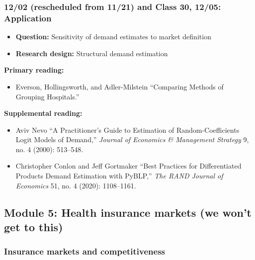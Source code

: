 \documentclass[11pt,]{article}
\providecommand{\tightlist}{%
  \setlength{\itemsep}{0pt}\setlength{\parskip}{0pt}}
\begin{document}
\hypertarget{rescheduled-from-1121-and-class-30-1205-application}{%
\subsubsection{12/02 (rescheduled from 11/21) and Class 30, 12/05:
Application}\label{rescheduled-from-1121-and-class-30-1205-application}}

\begin{itemize}
\tightlist
\item
  \textbf{Question:} Sensitivity of demand estimates to market
  definition
\item
  \textbf{Research design:} Structural demand estimation
\end{itemize}

\textbf{Primary reading:}

\begin{itemize}
\tightlist
\item
  Everson, Hollingsworth, and Adler-Milstein {``Comparing Methods of
  Grouping Hospitals.''}
\end{itemize}

\textbf{Supplemental reading:}

\begin{itemize}
\tightlist
\item
  Aviv Nevo {``A Practitioner's Guide to Estimation of
  Random-Coefficients Logit Models of Demand,''} \emph{Journal of
  Economics \& Management Strategy} 9, no. 4 (2000): 513--548.
\item
  Christopher Conlon and Jeff Gortmaker {``Best Practices for
  Differentiated Products Demand Estimation with {PyBLP},''} \emph{The
  RAND Journal of Economics} 51, no. 4 (2020): 1108--1161.
\end{itemize}

\hypertarget{module-5-health-insurance-markets-we-wont-get-to-this}{%
\subsection{Module 5: Health insurance markets (we won't get to
this)}\label{module-5-health-insurance-markets-we-wont-get-to-this}}

\hypertarget{insurance-markets-and-competitiveness}{%
\subsubsection{Insurance markets and
competitiveness}\label{insurance-markets-and-competitiveness}}
\end{document}
